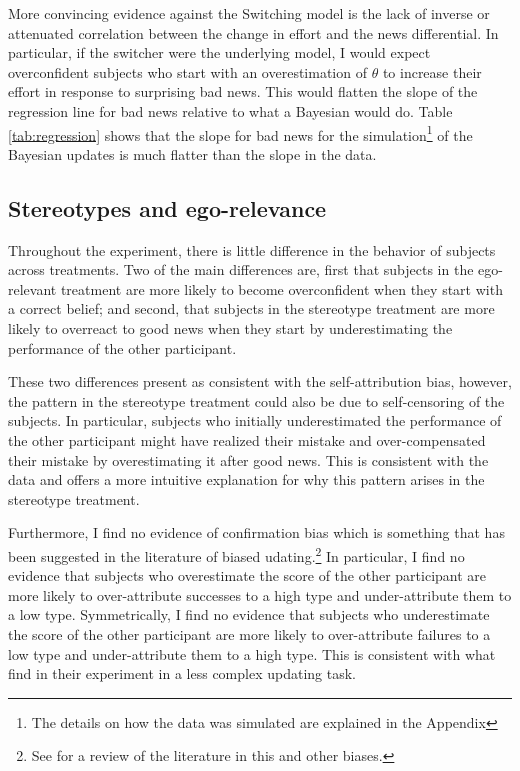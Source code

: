 \documentclass[
  12pt,
]{article}
\begin{document}
More convincing evidence against the Switching model is the lack of
inverse or attenuated correlation between the change in effort and the
news differential. In particular, if the switcher were the underlying
model, I would expect overconfident subjects who start with an
overestimation of \(\theta\) to increase their effort in response to
surprising bad news. This would flatten the slope of the regression line
for bad news relative to what a Bayesian would do. Table
\ref{tab:regression} shows that the slope for bad news for the
simulation\footnote{The details on how the data was simulated are explained in the Appendix}
of the Bayesian updates is much flatter than the slope in the data.

\hypertarget{stereotypes-and-ego-relevance}{%
\subsection{Stereotypes and
ego-relevance}\label{stereotypes-and-ego-relevance}}

Throughout the experiment, there is little difference in the behavior of
subjects across treatments. Two of the main differences are, first that
subjects in the ego-relevant treatment are more likely to become
overconfident when they start with a correct belief; and second, that
subjects in the stereotype treatment are more likely to overreact to
good news when they start by underestimating the performance of the
other participant.

These two differences present as consistent with the self-attribution
bias, however, the pattern in the stereotype treatment could also be due
to self-censoring of the subjects. In particular, subjects who initially
underestimated the performance of the other participant might have
realized their mistake and over-compensated their mistake by
overestimating it after good news. This is consistent with the data and
offers a more intuitive explanation for why this pattern arises in the
stereotype treatment.

Furthermore, I find no evidence of confirmation bias which is something
that has been suggested in the literature of biased
udating.\footnote{See \citet{benjamin2019} for a review of the literature in this and 
other biases.} In particular, I find no evidence that subjects who
overestimate the score of the other participant are more likely to
over-attribute successes to a high type and under-attribute them to a
low type. Symmetrically, I find no evidence that subjects who
underestimate the score of the other participant are more likely to
over-attribute failures to a low type and under-attribute them to a high
type. This is consistent with what \citet{Mobius2022} find in their
experiment in a less complex updating task.
\end{document}
